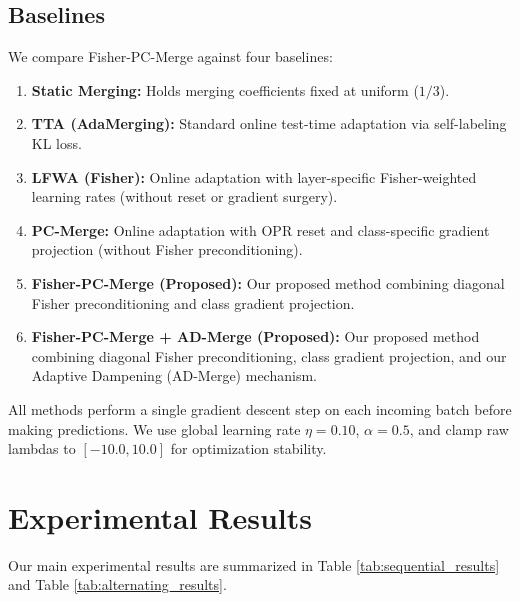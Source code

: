 \documentclass{article}
\theoremstyle{plain}
\theoremstyle{definition}
\theoremstyle{remark}
\begin{document}
\subsection{Baselines}
We compare Fisher-PC-Merge against four baselines:
\begin{enumerate}
    \item \textbf{Static Merging:} Holds merging coefficients fixed at uniform ($1/3$).
    \item \textbf{TTA (AdaMerging):} Standard online test-time adaptation via self-labeling KL loss.
    \item \textbf{LFWA (Fisher):} Online adaptation with layer-specific Fisher-weighted learning rates (without reset or gradient surgery).
    \item \textbf{PC-Merge:} Online adaptation with OPR reset and class-specific gradient projection (without Fisher preconditioning).
    \item \textbf{Fisher-PC-Merge (Proposed):} Our proposed method combining diagonal Fisher preconditioning and class gradient projection.
    \item \textbf{Fisher-PC-Merge + AD-Merge (Proposed):} Our proposed method combining diagonal Fisher preconditioning, class gradient projection, and our Adaptive Dampening (AD-Merge) mechanism.
\end{enumerate}
All methods perform a single gradient descent step on each incoming batch before making predictions. We use global learning rate $\eta = 0.10$, $\alpha = 0.5$, and clamp raw lambdas to $[-10.0, 10.0]$ for optimization stability.

\section{Experimental Results}
\label{experimental_results}
Our main experimental results are summarized in Table \ref{tab:sequential_results} and Table \ref{tab:alternating_results}.
\end{document}
